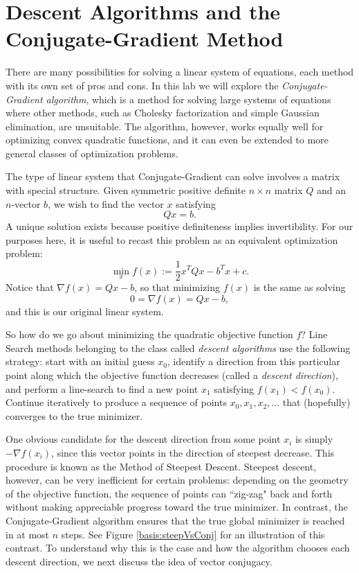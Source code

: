 
\section*{Descent Algorithms and the Conjugate-Gradient Method}
There are many possibilities for solving a linear system of equations, each method with its own set of pros and cons. In this lab we
will explore the \emph{Conjugate-Gradient algorithm}, which is a method for solving large systems of equations where other methods,
such as Cholesky factorization and simple Gaussian elimination, are unsuitable. The algorithm, however, works equally well for
optimizing convex quadratic functions, and it can even be extended to more general classes of optimization problems.

The type of linear system that Conjugate-Gradient can solve involves a matrix with special structure.
Given symmetric positive definite $n\times n$ matrix $Q$ and an $n$-vector $b$, we wish to find the vector $x$ satisfying
\[
Qx = b.
\]
A unique solution exists because positive definiteness implies invertibility.
For our purposes here, it is useful to recast this problem as an equivalent optimization problem:
\[
\min_{x} f(x) := \frac{1}{2}x^TQx - b^Tx + c.
\]
Notice that $\nabla f(x) = Qx - b$, so that minimizing $f(x)$ is the same as solving
\[
0 = \nabla f(x) = Qx - b,
\]
and this is our original linear system.

So how do we go about minimizing the quadratic objective function $f$? Line Search methods belonging to the class called
\emph{descent algorithms} use the following strategy: start with an initial guess $x_0$, identify a direction from
this particular point along which the objective function decreases (called a \emph{descent direction}), and perform a line-search to
find a new point $x_1$ satisfying $f(x_1) < f(x_0)$. Continue iteratively to produce a sequence of points $x_0, x_1, x_2, \ldots$
that (hopefully) converges to the true minimizer.

One obvious candidate for the descent direction from some point $x_i$ is simply
$-\nabla f(x_i)$, since this vector points in the direction of steepest decrease. This procedure is known as the Method of Steepest
Descent. Steepest descent, however, can be very inefficient for certain problems: depending on the geometry
of the objective function, the sequence of points can ``zig-zag" back and forth without making appreciable progress toward the true
minimizer. In contrast, the Conjugate-Gradient algorithm ensures that the true global minimizer is reached in at most $n$ steps. See
Figure \ref{basis:steepVsConj} for an illustration of this contrast.
To understand why this is the case and how the algorithm chooses each descent direction, we next discuss the idea of vector conjugacy.

